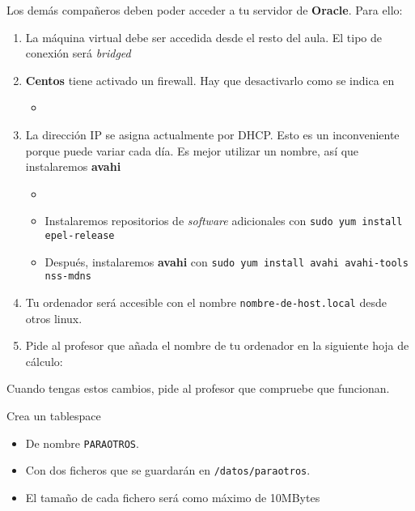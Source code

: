 \begin{homeworkProblem}

  Los demás compañeros deben poder acceder a tu servidor de \textbf{Oracle}. Para ello:
  \begin{enumerate}
  \item La máquina virtual debe ser accedida desde el resto del aula. El tipo de conexión será \textit{bridged}
  \item \textbf{Centos} tiene activado un firewall. Hay que desactivarlo como se indica en
    \begin{itemize}
    \item  {}
    \end{itemize}
    
  \item La dirección IP se asigna actualmente por DHCP. Esto es un inconveniente porque puede variar cada día. Es mejor utilizar un nombre, así que instalaremos \textbf{avahi}
    \begin{itemize}
    \item {}
    \item Instalaremos repositorios de \textit{software} adicionales con \texttt{sudo yum install epel-release}
    \item Después, instalaremos \textbf{avahi} con \texttt{sudo yum install avahi avahi-tools nss-mdns}

    \end{itemize}

  \item Tu ordenador será accesible con el nombre \texttt{nombre-de-host.local} desde otros linux.
  \item Pide al profesor que añada el nombre de tu ordenador en la siguiente hoja de cálculo: 
    
    
  \end{enumerate}

  Cuando tengas estos cambios, pide al profesor que compruebe que funcionan.
\end{homeworkProblem}

\begin{homeworkProblem}

  Crea un tablespace
  \begin{itemize}
  \item De nombre \texttt{PARAOTROS}.
  \item Con dos ficheros que se guardarán en \texttt{/datos/paraotros}.
  \item El tamaño de cada fichero será como máximo de 10MBytes
  \end{itemize}

\end{homeworkProblem}


